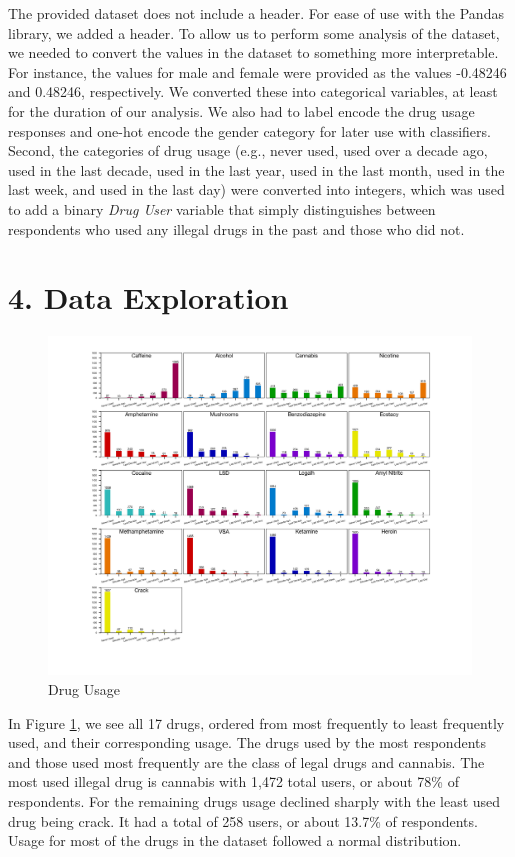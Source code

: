 \documentclass[10pt]{article}
\begin{document}
The provided dataset does not include a header. For ease of use with the Pandas library, we added a header. To allow us to perform some analysis of the dataset, we needed to convert the values in the dataset to something more interpretable. For instance, the values for male and female were provided as the values -0.48246 and 0.48246, respectively. We converted these into categorical variables, at least for the duration of our analysis. We also had to label encode the drug usage responses and one-hot encode the gender category for later use with classifiers. Second, the categories of drug usage (e.g., never used, used over a decade ago, used in the last decade, used in the last year, used in the last month, used in the last week, and used in the last day) were converted into integers, which was used to add a binary \textit{Drug User} variable that simply distinguishes between respondents who used any illegal drugs in the past and those who did not.

\section*{4. Data Exploration}

\begin{figure}[H]
\caption{Drug Usage}
\label{fig:drugs}
\centering
\includegraphics[scale=0.7]{drugs.png}
\end{figure}

In Figure \ref{fig:drugs}, we see all 17 drugs, ordered from most frequently to least frequently used, and their corresponding usage. The drugs used by the most respondents and those used most frequently are the class of legal drugs and cannabis. The most used illegal drug is cannabis with 1,472 total users, or about 78\% of respondents. For the remaining drugs usage declined sharply with the least used drug being crack. It had a total of 258 users, or about 13.7\% of respondents. Usage for most of the drugs in the dataset followed a normal distribution.
\end{document}
